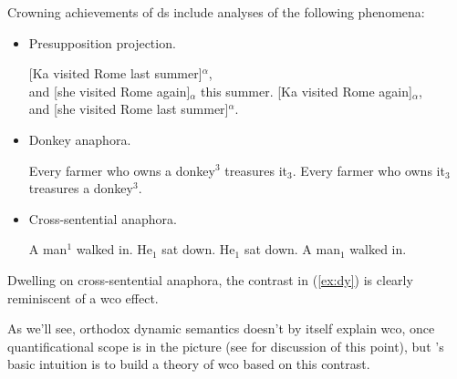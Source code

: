 \documentclass[nols,twoside,nofonts,nobib,nohyper]{tufte-handout}
\begin{document}
Crowning achievements of \ac{ds} include analyses of the following
phenomena:

\begin{itemize}

  \item Presupposition projection.

    \pex
    \a{}[Ka visited Rome last summer]$^{α}$,\\
    and [she visited Rome again]$_{α}$
    this summer.
    \a\ljudge{\#}{}[Ka visited Rome again]$_{α}$,\\
    and [she visited Rome last summer]$^{α}$.
    \xe

    \item Donkey anaphora.

    \pex
    \a Every farmer who owns a donkey$^{3}$ treasures it$_{3}$.
    \a{}Every farmer who owns it$_{3}$ treasures a donkey$^{3}$.
    \xe

    \item Cross-sentential anaphora.

    \pex\label{ex:dy}
    \a A man$^{1}$ walked in. He$_{1}$ sat down.\label{ex:dy1}
    \a\ljudge{*}He$_{1}$ sat down. A man$_{1}$ walked in.\label{ex:dy2}
    \xe

 \end{itemize}

    Dwelling on cross-sentential anaphora, the contrast in (\ref{ex:dy}) is
    clearly reminiscent of a \ac{wco} effect.

    As we'll see, orthodox dynamic
    semantics doesn't by itself explain \ac{wco}, once quantificational scope is in the picture (see
    \citealt{charlow2019static} for discussion of this point), but
    \citeauthor{chierchia2020}'s basic intuition is to build a theory of
    \ac{wco} based on this contrast.
\end{document}
